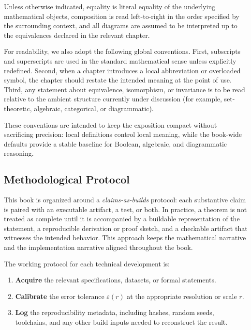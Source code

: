 \documentclass[11pt]{article}
\begin{document}
Unless otherwise indicated, equality is literal equality of the underlying mathematical objects, composition is read left-to-right in the order specified by the surrounding context, and all diagrams are assumed to be interpreted up to the equivalences declared in the relevant chapter.

For readability, we also adopt the following global conventions. First, subscripts and superscripts are used in the standard mathematical sense unless explicitly redefined. Second, when a chapter introduces a local abbreviation or overloaded symbol, the chapter should restate the intended meaning at the point of use. Third, any statement about equivalence, isomorphism, or invariance is to be read relative to the ambient structure currently under discussion (for example, set-theoretic, algebraic, categorical, or diagrammatic).

These conventions are intended to keep the exposition compact without sacrificing precision: local definitions control local meaning, while the book-wide defaults provide a stable baseline for Boolean, algebraic, and diagrammatic reasoning.



\subsection{Methodological Protocol}


This book is organized around a \emph{claims-as-builds} protocol: each substantive claim is paired with an executable artifact, a test, or both. In practice, a theorem is not treated as complete until it is accompanied by a buildable representation of the statement, a reproducible derivation or proof sketch, and a checkable artifact that witnesses the intended behavior. This approach keeps the mathematical narrative and the implementation narrative aligned throughout the book.

The working protocol for each technical development is:
\begin{enumerate}
  \item \textbf{Acquire} the relevant specifications, datasets, or formal statements.
  \item \textbf{Calibrate} the error tolerance \(\varepsilon(r)\) at the appropriate resolution or scale \(r\).
  \item \textbf{Log} the reproducibility metadata, including hashes, random seeds, toolchains, and any other build inputs needed to reconstruct the result.
\end{enumerate}
\end{document}
